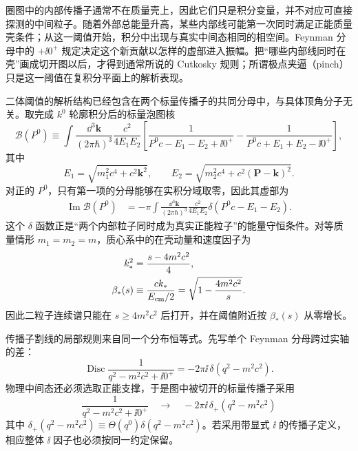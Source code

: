 圈图中的内部传播子通常不在质量壳上，因此它们只是积分变量，并不对应可直接探测的中间粒子。随着外部总能量升高，某些内部线可能第一次同时满足正能质量壳条件；从这一阈值开始，积分中出现与真实中间态相同的相空间。Feynman 分母中的 $+\ii0^+$ 规定决定这个新贡献以怎样的虚部进入振幅。把“哪些内部线同时在壳”画成切开图以后，才得到通常所说的 Cutkosky 规则；所谓极点夹逼（pinch）只是这一阈值在复积分平面上的解析表现。


二体阈值的解析结构已经包含在两个标量传播子的共同分母中，与具体顶角分子无关。取完成 $k^0$ 轮廓积分后的标量泡图核
\begin{equation}
 \mathcal B(P^0)
 \equiv
 \int\frac{\dd^3 \mathbf k}{(2\pi\hbar)^3}
 \frac{c^2}{4E_1E_2}
 \left[
 \frac{1}{P^0c-E_1-E_2+\ii0^+}
 -\frac{1}{P^0c+E_1+E_2-\ii0^+}
 \right],
 \label{eq:qft-bubble-after-k0-dp8}
\end{equation}
其中
\begin{equation*}
 E_1=\sqrt{m_1^2c^4+c^2\mathbf k^2},
 \qquad
 E_2=\sqrt{m_2^2c^4+c^2(\mathbf P-\mathbf k)^2}.
\end{equation*}
对正的 $P^0$，只有第一项的分母能够在实积分域取零，因此其虚部为
\begin{align}
 \operatorname{Im}\mathcal B(P^0)
 &=-\pi
 \int\frac{\dd^3 \mathbf k}{(2\pi\hbar)^3}
 \frac{c^2}{4E_1E_2}
 \delta(P^0c-E_1-E_2).
 \label{eq:bubble-imag-phase-space-dp8}
\end{align}
这个 $\delta$ 函数正是“两个内部粒子同时成为真实正能粒子”的能量守恒条件。对等质量情形 $m_1=m_2=m$，质心系中的在壳动量和速度因子为
\begin{align}
 k_*^2
 &=\frac{s-4m^2c^2}{4},\\
 \beta_*(s)
 &\equiv\frac{ck_*}{E_{\rm cm}/2}
 =\sqrt{1-\frac{4m^2c^2}{s}}.
 \label{eq:two-body-threshold-beta-dp8}
\end{align}
因此二粒子连续谱只能在 $s\ge4m^2c^2$ 后打开，并在阈值附近按 $\beta_*(s)$ 从零增长。

传播子割线的局部规则来自同一个分布恒等式。先写单个 Feynman 分母跨过实轴的差：
\begin{equation}
 \operatorname{Disc}\frac1{q^2-m^2c^2+\ii0^+}
 =-2\pi\ii\,\delta(q^2-m^2c^2).
 \label{eq:feynman-denominator-discontinuity-dp68}
\end{equation}
物理中间态还必须选取正能支撑，于是图中被切开的标量传播子采用
\begin{equation}
 \boxed{
 \frac1{q^2-m^2c^2+\ii0^+}
 \quad\longrightarrow\quad
 -2\pi\ii\,\delta_+(q^2-m^2c^2)}
 \label{eq:cutkosky-propagator-rule-dp8}
\end{equation}
其中 $\delta_+(q^2-m^2c^2)\equiv\Theta(q^0)\delta(q^2-m^2c^2)$。若采用带显式 $\ii$ 的传播子定义，相应整体 $\ii$ 因子也必须按同一约定保留。


